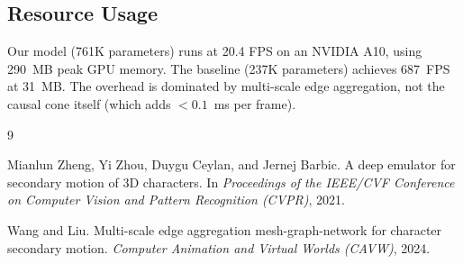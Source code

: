 \documentclass[10pt,twocolumn]{article}
\begin{document}
\subsection{Resource Usage}

Our model (761K parameters) runs at 20.4 FPS on an NVIDIA A10, using 290~MB peak GPU memory. The baseline (237K parameters) achieves 687~FPS at 31~MB. The overhead is dominated by multi-scale edge aggregation, not the causal cone itself (which adds $<0.1$~ms per frame).


\begin{thebibliography}{9}

Mianlun Zheng, Yi Zhou, Duygu Ceylan, and Jernej Barbic.
\newblock A deep emulator for secondary motion of 3{D} characters.
\newblock In \emph{Proceedings of the IEEE/CVF Conference on Computer Vision and Pattern Recognition (CVPR)}, 2021.

Wang and Liu.
\newblock Multi-scale edge aggregation mesh-graph-network for character secondary motion.
\newblock \emph{Computer Animation and Virtual Worlds (CAVW)}, 2024.

\end{thebibliography}
\end{document}
